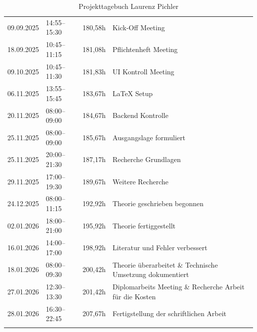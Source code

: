 \begin{longtable}{p{2.8cm} | p{2.5cm} | p{2.5cm} | p{7cm}}
09.09.2025 & 14:55–15:30 & 180,58h & Kick-Off Meeting \\
18.09.2025 & 10:45–11:15 & 181,08h & Pflichtenheft Meeting \\
09.10.2025 & 10:45–11:30 & 181,83h & UI Kontroll Meeting \\
06.11.2025 & 13:55–15:45 & 183,67h & LaTeX Setup \\
20.11.2025 & 08:00–09:00 & 184,67h & Backend Kontrolle \\

25.11.2025 & 08:00–09:00 & 185,67h & Ausgangslage formuliert \\
25.11.2025 & 20:00–21:30 & 187,17h & Recherche Grundlagen \\
29.11.2025 & 17:00–19:30 & 189,67h & Weitere Recherche \\

24.12.2025 & 08:00–11:15 & 192,92h & Theorie geschrieben begonnen \\
02.01.2026 & 18:00–21:00 & 195,92h & Theorie fertiggestellt \\
16.01.2026 & 14:00–17:00 & 198,92h & Literatur und Fehler verbessert \\
18.01.2026 & 08:00–09:30 & 200,42h & Theorie überarbeitet \& Technische Umsetzung dokumentiert \\
27.01.2026 & 12:30–13:30 & 201,42h & Diplomarbeits Meeting \& Recherche Arbeit für die Kosten \\
28.01.2026 & 16:30–22:45 & 207,67h & Fertigstellung der schriftlichen Arbeit \\

\caption{Projekttagebuch Laurenz Pichler}
\label{tab:arbeitstagebuch-pichler}
\end{longtable}
\newpage
	
